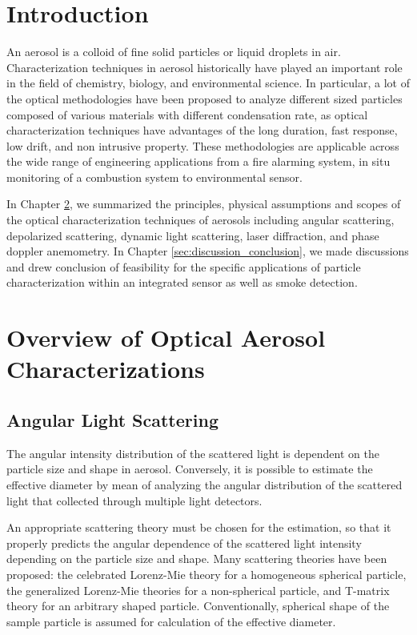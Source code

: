 \documentclass[12pt]{article}
\begin{document}
\section{Introduction}
An aerosol is a colloid of fine solid particles or liquid droplets in air. Characterization techniques in aerosol historically have played an important role in the field of chemistry, biology, and environmental science.  In particular, a lot of the optical methodologies have been proposed to analyze different sized particles composed of various materials with different condensation rate, as optical characterization techniques have advantages of the long duration, fast response, low drift, and non intrusive property. These methodologies are applicable across the wide range of engineering applications from a fire alarming system, in situ monitoring of a combustion system to environmental sensor. 

In Chapter \ref{sec:overview}, we summarized the principles, physical assumptions and scopes of the optical characterization techniques of aerosols including angular scattering, depolarized scattering, dynamic light scattering, laser diffraction, and phase doppler anemometry. In Chapter \ref{sec:discussion_conclusion}, we made discussions and drew conclusion of feasibility for the specific applications of particle characterization within an integrated sensor as well as smoke detection.

\section{Overview of Optical Aerosol Characterizations}
\label{sec:overview}

\subsection{Angular Light Scattering}
The angular intensity distribution of the scattered light is dependent on the particle size and shape in aerosol. Conversely, it is possible to estimate the effective diameter by mean of analyzing the angular distribution of the scattered light that collected through multiple light detectors.

An appropriate scattering theory must be chosen for the estimation, so that it properly predicts the angular dependence of the scattered light intensity depending on the particle size and shape. Many scattering theories have been proposed: the celebrated Lorenz-Mie theory for a homogeneous spherical particle\cite{Review_Scattering_theory}, the generalized Lorenz-Mie theories for a non-spherical particle\cite{Mie_theory_perturbation}\cite{Generalized_Mie_theory}, and T-matrix theory for an arbitrary shaped particle\cite{T-matrix_fractal}\cite{T-matrix_soot}\cite{T-matrix_review}. Conventionally, spherical shape of the sample particle is assumed for calculation of the effective diameter. 
\end{document}
